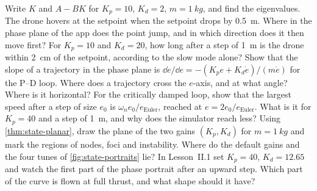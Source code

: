 \begin{exercises}
\exercise[1] Write $K$ and $A - BK$ for $K_p = 10$, $K_d = 2$, $m = \SI{1}{kg}$, and find the eigenvalues.
\exercise[1] The drone hovers at the setpoint when the setpoint drops by \SI{0.5}{m}. Where in the phase plane of the app does the point jump, and in which direction does it then move first?
\exercise[1] For $K_p = 10$ and $K_d = 20$, how long after a step of \SI{1}{m} is the drone within \SI{2}{cm} of the setpoint, according to the slow mode alone?
\exercise[2] Show that the slope of a trajectory in the phase plane is $\dd\dot e/\dd e = -(K_p e + K_d\dot e)/(m\dot e)$ for the P–D loop. Where does a trajectory cross the $e$-axis, and at what angle? Where is it horizontal?
\exercise[2] For the critically damped loop, show that the largest speed after a step of size $e_0$ is $\omega_ne_0/e_{\mathrm{Euler}}$, reached at $e = 2e_0/e_{\mathrm{Euler}}$. What is it for $K_p = 40$ and a step of \SI{1}{m}, and why does the simulator reach less?
\exercise[2] Using \cref{thm:state-planar}, draw the plane of the two gains $(K_p, K_d)$ for $m = \SI{1}{kg}$ and mark the regions of nodes, foci and instability. Where do the default gains and the four tunes of \cref{fig:state-portraits} lie?
\exercise[2] In Lesson~II.1 set $K_p = 40$, $K_d = 12.65$ and watch the first part of the phase portrait after an upward step. Which part of the curve is flown at full thrust, and what shape should it have?

\end{exercises}
